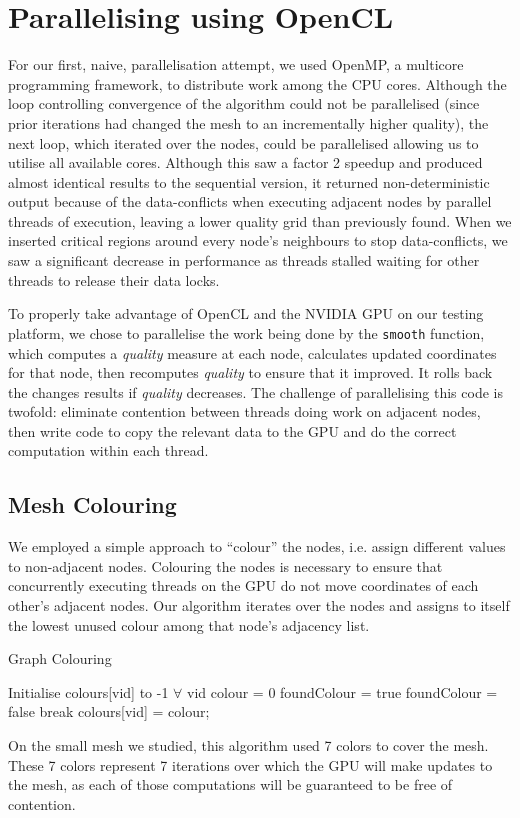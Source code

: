\documentclass[a4paper,12pt, twocolumn]{article}
\begin{document}
\section{Parallelising using OpenCL}
For our first, naive, parallelisation attempt, we used OpenMP, a multicore programming framework, to distribute work among the CPU cores.
Although the loop controlling convergence of the algorithm could not be parallelised (since prior iterations had changed the mesh to an incrementally higher quality), the next loop, which iterated over the nodes, could be parallelised allowing us to utilise all available cores.
Although this saw a factor 2 speedup and produced almost identical results to the sequential version, it returned non-deterministic output because of the data-conflicts when executing adjacent nodes by parallel threads of execution, leaving a lower quality grid than previously found.
When we inserted critical regions around every node's neighbours to stop data-conflicts, we saw a significant decrease in performance as threads stalled waiting for other threads to release their data locks.

To properly take advantage of OpenCL and the NVIDIA GPU on our testing platform, we chose to parallelise the work being done by the \verb+smooth+ function, which computes a \emph{quality} measure at each node, calculates updated coordinates for that node, then recomputes \emph{quality} to ensure that it improved.
It rolls back the changes results if \emph{quality} decreases.
The challenge of parallelising this code is twofold: eliminate contention between threads doing work on adjacent nodes, then write code to copy the relevant data to the GPU and do the correct computation within each thread.

\subsection{Mesh Colouring}
We employed a simple approach to ``colour'' the nodes, i.e. assign different values to non-adjacent nodes.
Colouring the nodes is necessary to ensure that concurrently executing threads on the GPU do not move coordinates of each other's adjacent nodes.
Our algorithm iterates over the nodes and assigns to itself the lowest unused colour among that node's adjacency list.
\begin{algorithm}[H]
\caption{Graph Colouring}
\label{al:colour}
\begin{algorithmic}[1]
\STATE Initialise colours[vid] to -1 $\forall$ vid
  \STATE colour = 0
    \STATE foundColour = true
        \STATE foundColour = false
        \STATE break
      \ENDIF
    \ENDFOR
  \ENDWHILE
  \STATE colours[vid] = colour;
\ENDFOR
\end{algorithmic}
\end{algorithm}
On the small mesh we studied, this algorithm used 7 colors to cover the mesh.  These 7 colors represent 7 iterations over which the GPU will make updates to the mesh, as each of those computations will be guaranteed to be free of contention.  
\end{document}
